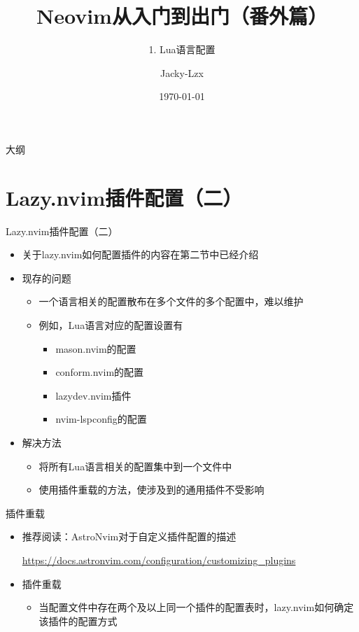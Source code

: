 \documentclass[aspectratio=169]{ctexbeamer}
\title{Neovim从入门到出门（番外篇）}
\subtitle{1. Lua语言配置}
\author{Jacky-Lzx}
\date{\today}
\begin{document}
\begin{frame}
  \titlepage
\end{frame}
\begin{frame}{大纲}
  \tableofcontents
\end{frame}

\section{Lazy.nvim插件配置（二）}

\begin{frame}{Lazy.nvim插件配置（二）}
  \begin{itemize}
    \item 关于lazy.nvim如何配置插件的内容在第二节中已经介绍
    \item 现存的问题
      \begin{itemize}
        \item 一个语言相关的配置散布在多个文件的多个配置中，难以维护
        \item 例如，Lua语言对应的配置设置有
          \begin{itemize}
            \item mason.nvim的配置
            \item conform.nvim的配置
            \item lazydev.nvim插件
            \item nvim-lspconfig的配置
          \end{itemize}
      \end{itemize}
    \item 解决方法
      \begin{itemize}
        \item 将所有Lua语言相关的配置集中到一个文件中
        \item 使用插件重载的方法，使涉及到的通用插件不受影响
      \end{itemize}
  \end{itemize}
\end{frame}

\begin{frame}{插件重载}
  \begin{itemize}
    \item 推荐阅读：AstroNvim对于自定义插件配置的描述

      \url{https://docs.astronvim.com/configuration/customizing_plugins}
    \item 插件重载
      \begin{itemize}
        \item 当配置文件中存在两个及以上同一个插件的配置表时，lazy.nvim如何确定该插件的配置方式
      \end{itemize}
  \end{itemize}
\end{frame}
\end{document}
